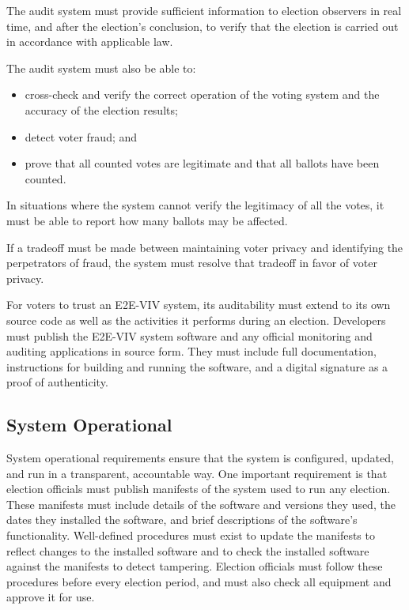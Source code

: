 The audit system must provide sufficient information to election
observers in real time, and after the election's conclusion, to verify
that the election is carried out in accordance with applicable law.

The audit system must also be able to:

\begin{itemize}
\item cross-check and verify the correct operation of the voting
  system and the accuracy of the election results;
\item detect voter fraud; and 
\item prove that all counted
votes are legitimate and that all ballots have been counted. 
\end{itemize}

In situations where the system cannot verify the legitimacy of all the
votes, it must be able to report how many ballots may be affected.

If a tradeoff must be made between maintaining voter privacy and
identifying the perpetrators of fraud, the system must resolve that
tradeoff in favor of voter privacy.

For voters to trust an E2E-VIV system, its auditability must extend to
its own source code as well as the activities it performs during an
election. Developers must publish the E2E-VIV system software and any
official monitoring and auditing applications in source form. They
must include full documentation, instructions for building and running
the software, and a digital signature as a proof of authenticity.

\subsection{System Operational}

System operational requirements ensure that the system is configured,
updated, and run in a transparent, accountable way. One important
requirement is that election officials must publish manifests of the
system used to run any election. These manifests must include details
of the software and versions they used, the dates they installed the
software, and brief descriptions of the software's
functionality. Well-defined procedures must exist to update the
manifests to reflect changes to the installed software and to check
the installed software against the manifests to detect
tampering. Election officials must follow these procedures before
every election period, and must also check all equipment and approve
it for use.

